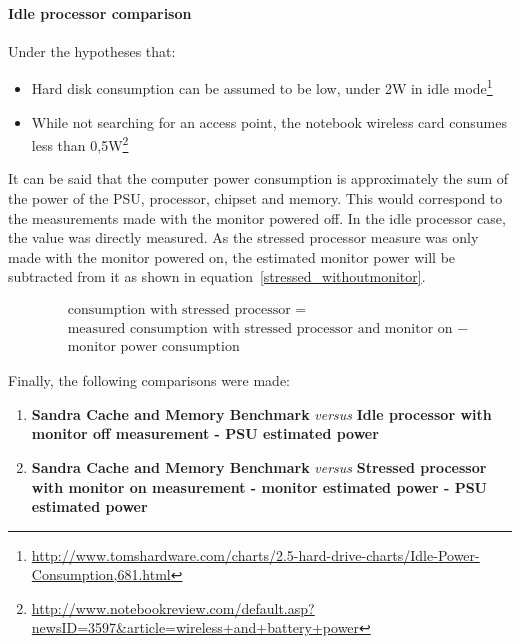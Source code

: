         \paragraph*{Idle processor comparison}
            Under the hypotheses that: 
            
        \begin{itemize}
            \item Hard disk consumption can be assumed to be low, under 2W in idle mode\footnote{\url{http://www.tomshardware.com/charts/2.5-hard-drive-charts/Idle-Power-Consumption,681.html}}
            \item While not searching for an access point, the notebook wireless card consumes less than 0,5W\footnote{\url{http://www.notebookreview.com/default.asp?newsID=3597&article=wireless+and+battery+power}}
        \end{itemize}
        
            It can be said that the computer power consumption is approximately the sum of the power of the PSU, processor, chipset and memory. This would correspond to the measurements made with the monitor powered off. In the idle processor case, the value was directly measured. As the stressed processor measure was only made with the monitor powered on, the estimated monitor power will be subtracted from it as shown in equation~\ref{stressed_withoutmonitor}.
            
            \begin{equation}
                \begin{split}
                &\text{ consumption with stressed processor } = \\
                &\text{ measured consumption with stressed processor and monitor on }-\\
                &\text{ monitor power consumption }
                \end{split}
                \label{stressed_withoutmonitor}
            \end{equation}
            
            Finally, the following comparisons were made:

            \begin{enumerate}
                \item \textbf{Sandra Cache and Memory Benchmark} \emph{versus} \textbf{Idle processor with monitor off measurement - PSU estimated power}
                \item \textbf{Sandra Cache and Memory Benchmark} \emph{versus} \textbf{Stressed processor with monitor on measurement - monitor estimated power - PSU estimated power}
            \end{enumerate}


